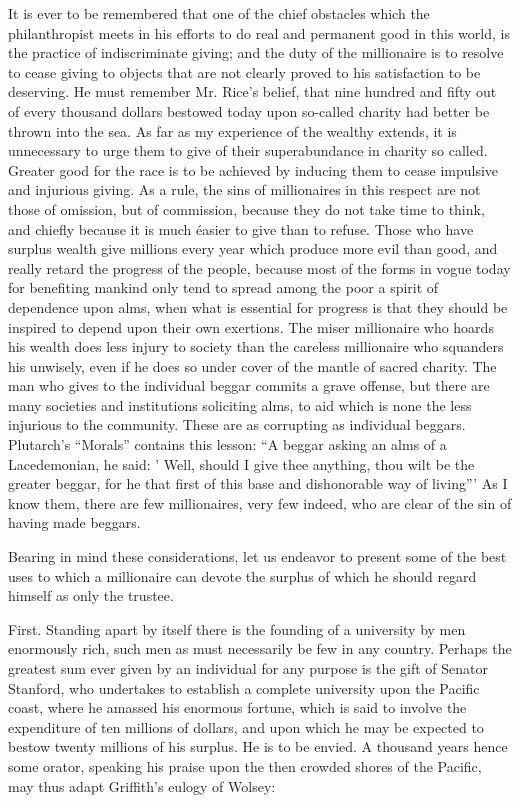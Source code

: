 \documentclass[11pt,openany]{book}
\begin{document}
It is ever to be remembered that one of the chief obstacles which the philanthropist meets in his efforts to do real and permanent good in this world, is the practice of indiscriminate giving; and the duty of the millionaire is to resolve to cease giving to objects that are not clearly proved to his satisfaction to be deserving. He must remember Mr. Rice's belief, that nine hundred and fifty out of every thousand dollars bestowed today upon so-called charity had better be thrown into the sea. As far as my experience of the wealthy extends, it is unnecessary to urge them to give of their superabundance in charity so called. Greater good for the race is to be achieved by inducing them to cease impulsive and injurious giving. As a rule, the sins of millionaires in this respect are not those of omission, but of commission, because they do not take time to think, and chiefly because it is much éasier to give than to refuse. Those who have surplus wealth give millions every year which produce more evil than good, and really retard the progress of the people, because most of the forms in vogue today for benefiting mankind only tend to spread among the poor a spirit of dependence upon alms, when what is essential for progress is that they should be inspired to depend upon their own exertions. The miser millionaire who hoards his wealth does less injury to society than the careless millionaire who squanders his unwisely, even if he does so under cover of the mantle of sacred charity. The man who gives to the individual beggar commits a grave offense, but there are many societies and institutions soliciting alms, to aid which is none the less injurious to the community. These are as corrupting as individual beggars. Plutarch's ``Morals'' contains this lesson: ``A beggar asking an alms of a Lacedemonian, he said: ' Well, should I give thee anything, thou wilt be the greater beggar, for he that first of this base and dishonorable way of living''' As I know them, there are few millionaires, very few indeed, who are clear of the sin of having made beggars.

Bearing in mind these considerations, let us endeavor to present some of the best uses to which a millionaire can devote the surplus of which he should regard himself as only the trustee.

First. Standing apart by itself there is the founding of a university by men enormously rich, such men as must necessarily be few in any country. Perhaps the greatest sum ever given by an individual for any purpose is the gift of Senator Stanford, who undertakes to establish a complete university upon the Pacific coast, where he amassed his enormous fortune, which is said to involve the expenditure of ten millions of dollars, and upon which he may be expected to bestow twenty millions of his surplus. He is to be envied. A thousand years hence some orator, speaking his praise upon the then crowded shores of the Pacific, may thus adapt Griffith's eulogy of Wolsey:
\end{document}
